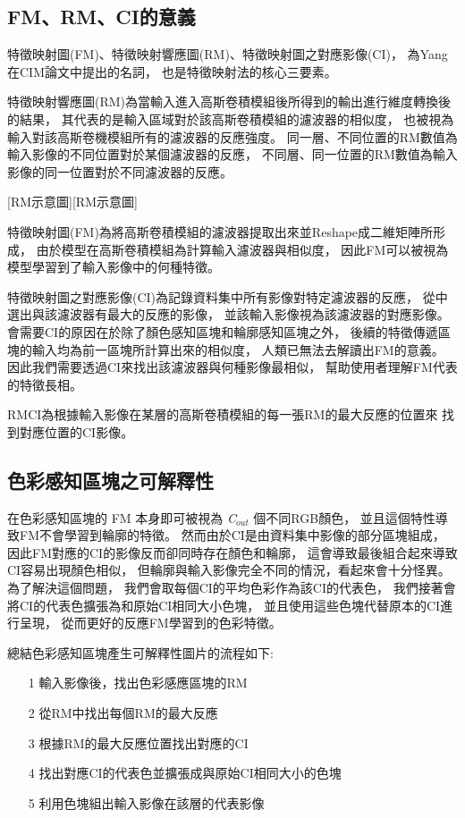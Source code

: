 \documentclass[class=NCU_thesis, crop=false]{standalone}
\begin{document}
	\subsection{FM、RM、CI的意義}
	\label{section:InterablePicture}
	特徵映射圖(FM)、特徵映射響應圖(RM)、特徵映射圖之對應影像(CI)，
	為Yang在CIM論文中提出的名詞，
	也是特徵映射法的核心三要素。

	特徵映射響應圖(RM)為當輸入進入高斯卷積模組後所得到的輸出進行維度轉換後的結果，
	其代表的是輸入區域對於該高斯卷積模組的濾波器的相似度，
	也被視為輸入對該高斯卷機模組所有的濾波器的反應強度。
	同一層、不同位置的RM數值為輸入影像的不同位置對於某個濾波器的反應，
	不同層、同一位置的RM數值為輸入影像的同一位置對於不同濾波器的反應。

	[RM示意圖\cite{YangCNNInterpretable}][RM示意圖]

	特徵映射圖(FM)為將高斯卷積模組的濾波器提取出來並Reshape成二維矩陣所形成，
	由於模型在高斯卷積模組為計算輸入濾波器與相似度，
	因此FM可以被視為模型學習到了輸入影像中的何種特徵。

	特徵映射圖之對應影像(CI)為記錄資料集中所有影像對特定濾波器的反應，
	從中選出與該濾波器有最大的反應的影像，
	並該輸入影像視為該濾波器的對應影像。
	會需要CI的原因在於除了顏色感知區塊和輪廓感知區塊之外，
	後續的特徵傳遞區塊的輸入均為前一區塊所計算出來的相似度，
	人類已無法去解讀出FM的意義。
	因此我們需要透過CI來找出該濾波器與何種影像最相似，
	幫助使用者理解FM代表的特徵長相。

	RM\-CI為根據輸入影像在某層的高斯卷積模組的每一張RM的最大反應的位置來
	找到對應位置的CI影像。

	\subsection{色彩感知區塊之可解釋性}
	在色彩感知區塊的 FM 本身即可被視為 \textit{C}$_{out}$ 個不同RGB顏色，
	並且這個特性導致FM不會學習到輪廓的特徵。
	然而由於CI是由資料集中影像的部分區塊組成，
	因此FM對應的CI的影像反而卻同時存在顏色和輪廓，
	這會導致最後組合起來導致CI容易出現顏色相似，
	但輪廓與輸入影像完全不同的情況，看起來會十分怪異。
	為了解決這個問題，
	我們會取每個CI的平均色彩作為該CI的代表色，
	我們接著會將CI的代表色擴張為和原始CI相同大小色塊，
	並且使用這些色塊代替原本的CI進行呈現，
	從而更好的反應FM學習到的色彩特徵。

	總結色彩感知區塊產生可解釋性圖片的流程如下:
	\begin{itemize}
		\item [1]
		輸入影像後，找出色彩感應區塊的RM
		\item [2]
		從RM中找出每個RM的最大反應
		\item [3]
		根據RM的最大反應位置找出對應的CI
		\item [4]
		找出對應CI的代表色並擴張成與原始CI相同大小的色塊
		\item [5]
		利用色塊組出輸入影像在該層的代表影像
	\end{itemize}
\end{document}
